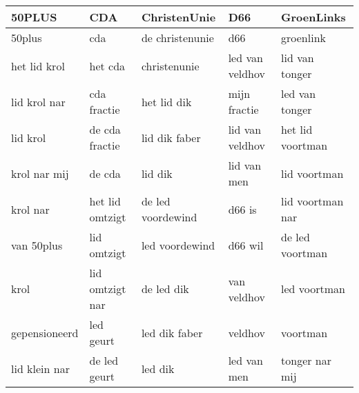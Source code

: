 \begin{tabular}{lllll}
\toprule
        50PLUS &              CDA &       ChristenUnie &              D66 &        GroenLinks \\
\midrule
        50plus &              cda &    de christenunie &              d66 &         groenlink \\
  het lid krol &          het cda &       christenunie &  led van veldhov &    lid van tonger \\
  lid krol nar &      cda fractie &        het lid dik &     mijn fractie &    led van tonger \\
      lid krol &   de cda fractie &      lid dik faber &  lid van veldhov &  het lid voortman \\
  krol nar mij &           de cda &            lid dik &      lid van men &      lid voortman \\
      krol nar &  het lid omtzigt &  de led voordewind &           d66 is &  lid voortman nar \\
    van 50plus &      lid omtzigt &     led voordewind &          d66 wil &   de led voortman \\
          krol &  lid omtzigt nar &         de led dik &      van veldhov &      led voortman \\
 gepensioneerd &        led geurt &      led dik faber &          veldhov &          voortman \\
 lid klein nar &     de led geurt &            led dik &      led van men &    tonger nar mij \\
\bottomrule
\end{tabular}
